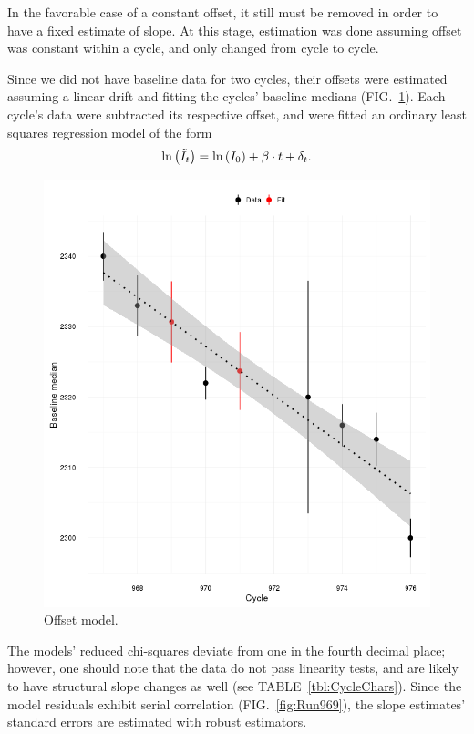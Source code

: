 \documentclass[reprint]{revtex4-1}
\newcommand{\scl}{.39}
\begin{document}
In the favorable case of a constant offset, it still must be removed in order to have a fixed estimate of slope. At this stage, estimation was done assuming offset was constant within a cycle, and only changed from cycle to cycle.

Since we did not have baseline data for two cycles, their offsets were estimated assuming a linear drift and fitting the cycles' baseline medians (FIG.~\ref{fig:OffsetModel}). Each cycle's data were subtracted its respective offset, and were fitted an ordinary least squares regression model of the form
\begin{equation}
	\ln\bkt{\tilde{I}_t} = \ln\bkt{I_0} + \slp\cdot t + \delta_t.
\end{equation}

\begin{figure}[h]
\includegraphics[scale=\scl]{../img/Offset_model_Common_GAM}
\caption{Offset model.\label{fig:OffsetModel}}
\end{figure}

The models' reduced chi-squares deviate from one in the fourth decimal place; however, one should note that the data do not pass linearity tests, and are likely to have structural slope changes as well (see TABLE~\ref{tbl:CycleChars}). Since the model residuals exhibit serial correlation (FIG.~\ref{fig:Run969}), the slope estimates' standard errors are estimated with robust estimators.
\end{document}
